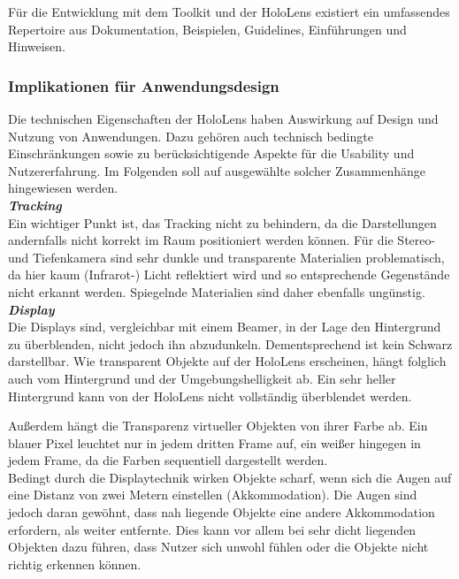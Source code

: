 Für die Entwicklung mit dem Toolkit und der HoloLens existiert ein umfassendes Repertoire aus Dokumentation, Beispielen, Guidelines, Einführungen und Hinweisen.\\


\subsubsection{Implikationen für Anwendungsdesign}
\label{sec-2-1-4}
Die technischen Eigenschaften der HoloLens haben Auswirkung auf Design und Nutzung von Anwendungen. Dazu gehören auch technisch bedingte Einschränkungen sowie zu berücksichtigende Aspekte für die Usability und Nutzererfahrung. Im Folgenden soll auf ausgewählte solcher Zusammenhänge hingewiesen werden.\\

\textbf{\textit{Tracking}}\\
Ein wichtiger Punkt ist, das Tracking nicht zu behindern, da die Darstellungen andernfalls nicht korrekt im Raum positioniert werden können. Für die Stereo- und Tiefenkamera sind sehr dunkle und transparente Materialien problematisch, da hier kaum (Infrarot-) Licht reflektiert wird und so entsprechende Gegenstände nicht erkannt werden. Spiegelnde Materialien sind daher ebenfalls ungünstig.\\

\textbf{\textit{Display}}\\
Die Displays sind, vergleichbar mit einem Beamer, in der Lage den Hintergrund zu überblenden, nicht jedoch ihn abzudunkeln. Dementsprechend ist kein Schwarz darstellbar. Wie transparent Objekte auf der HoloLens erscheinen, hängt folglich auch vom Hintergrund und der Umgebungshelligkeit ab. Ein sehr heller Hintergrund kann von der HoloLens nicht vollständig überblendet werden.
\par
\noindent\hspace*{5mm}
Außerdem hängt die Transparenz virtueller Objekten von ihrer Farbe ab. Ein blauer Pixel leuchtet nur in jedem dritten Frame auf, ein weißer hingegen in jedem Frame, da die Farben sequentiell dargestellt werden.\\

Bedingt durch die Displaytechnik wirken Objekte scharf, wenn sich die Augen auf eine Distanz von zwei Metern einstellen (Akkommodation). Die Augen sind jedoch daran gewöhnt, dass nah liegende Objekte eine andere Akkommodation erfordern, als weiter entfernte. Dies kann vor allem bei sehr dicht liegenden Objekten dazu führen, dass Nutzer sich unwohl fühlen oder die Objekte nicht richtig erkennen können.

